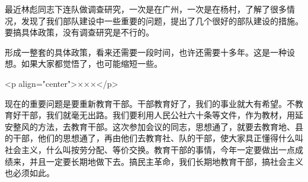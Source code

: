 最近林彪同志下连队做调查研究，一次是在广州，一次是在杨村，了解了很多情况，发现了我们部队建设中一些重要的问题，提出了几个很好的部队建设的措施。要搞具体政策，没有调查研究是不行的。

形成一整套的具体政策，看来还需要一段时间，也许还需要十多年。这是一种设想。如果大家都觉悟了，也可能缩短一些。

<p align="center">×××</p>

现在的重要问题是要重新教育干部。干部教育好了，我们的事业就大有希望。不教育好干部，我们就毫无出路。我们要利用人民公社六十条等文件，作为教材，用延安整风的方法，去教育干部。这次参加会议的同志，思想通了，就要去教育地、县的干部，他们的思想通了，再由他们去教育社、队的干部，使大家具正懂得什么叫社会主义，什么叫按劳分配、等价交换。教育干部的事情，今年一定要做出一点成绩来，并且一定要长期地做下去。搞民主革命，我们长期地教育干部，搞社会主义也必须如此。



